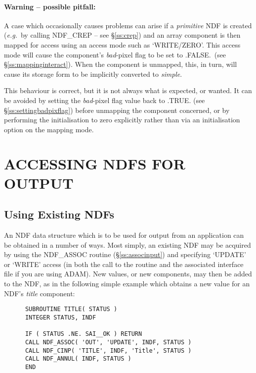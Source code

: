\documentclass[twoside,11pt]{article}
\newcommand{\htmlref}[2]{#1}
\newcommand{\xref}[3]{#1}
\newcommand{\xlabel}[1]{}
\newcommand{\st}[1]{{\em{#1}}}
\begin{document}
\paragraph{Warning -- possible pitfall:} A case which occasionally causes
problems can arise if a \st{primitive\/} NDF is created (\st{e.g.}\ by
calling \htmlref{NDF\_CREP}{NDF_CREP} -- see \S\ref{ss:crep}) and an array component is then
mapped for access using an access mode such as `WRITE/ZERO'. 
This access mode will cause the component's \st{bad}-pixel flag to be set
to .FALSE.\ (see \S\ref{ss:mappinginteract}). 
When the component is unmapped, this, in turn, will cause its storage form
to be implicitly converted to \st{simple}. 

This behaviour is correct, but it is not always what is expected, or wanted.
It can be avoided by setting the \st{bad}-pixel flag value back to
.TRUE. (see \S\ref{ss:settingbadpixflag}) before unmapping the
component concerned,
or by performing the initialisation to zero explicitly rather than via an
initialisation option on the mapping mode. 


\section{\xlabel{accessing_ndfs_for_output}ACCESSING NDFS FOR OUTPUT}

\subsection{\xlabel{using_existing_ndfs}Using Existing NDFs}

An NDF data structure which is to be used for output from an application can
be obtained in a number of ways. 
Most simply, an existing NDF may be acquired by using the \htmlref{NDF\_ASSOC}{NDF_ASSOC} routine
(\S\ref{ss:associnput}) and specifying `UPDATE' or `WRITE' access (in both the
call to the routine and the associated interface file if you are using
\xref{ADAM}{sg4}{}).
New values, or new components, may then be added to the NDF, as in the
following simple example which obtains a new value for an NDF's \st{title\/}
component: 

\small
\begin{verbatim}
      SUBROUTINE TITLE( STATUS )
      INTEGER STATUS, INDF

      IF ( STATUS .NE. SAI__OK ) RETURN
      CALL NDF_ASSOC( 'OUT', 'UPDATE', INDF, STATUS )
      CALL NDF_CINP( 'TITLE', INDF, 'Title', STATUS )
      CALL NDF_ANNUL( INDF, STATUS )
      END
\end{verbatim}
\normalsize
\end{document}
